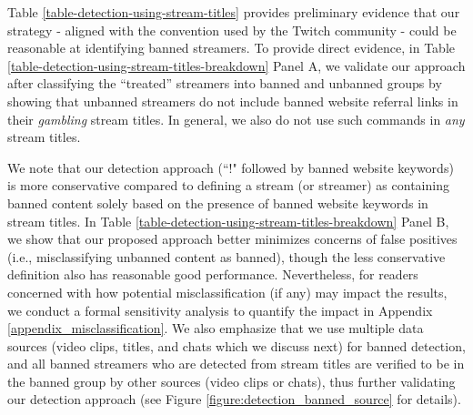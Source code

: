 \documentclass[a4paper,12pt]{article}
\begin{document}
Table \ref{table-detection-using-stream-titles} provides preliminary evidence that our strategy - aligned with the convention used by the Twitch community - could be reasonable at identifying banned streamers. To provide direct evidence, in Table \ref{table-detection-using-stream-titles-breakdown} Panel A, we validate our approach after classifying the ``treated'' streamers into banned and unbanned groups by showing that unbanned streamers do not include banned website referral links in their \textit{gambling} stream titles. In general, we also do not use such commands in \textit{any} stream titles. 


We note that our detection approach (``!" followed by banned website keywords) is more conservative compared to defining a stream (or streamer) as containing banned content solely based on the presence of banned website keywords in stream titles. In Table \ref{table-detection-using-stream-titles-breakdown} Panel B, we show that our proposed approach better minimizes concerns of false positives (i.e., misclassifying unbanned content as banned), though the less conservative definition also has reasonable good performance. Nevertheless, for readers concerned with how potential misclassification (if any) may impact the results, we conduct a formal sensitivity analysis to quantify the impact in Appendix \ref{appendix_misclassification}. We also emphasize that we use multiple data sources (video clips, titles, and chats which we discuss next) for banned detection, and all banned streamers who are detected from stream titles are verified to be in the banned group by other sources (video clips or chats), thus further validating our detection approach (see Figure \ref{figure:detection_banned_source} for details). 



\end{document}
